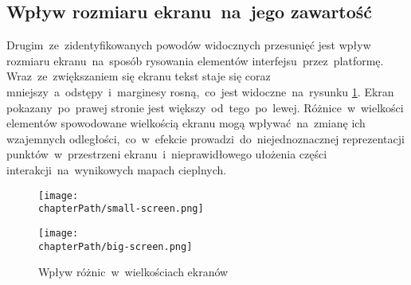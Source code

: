 \subsection{Wpływ rozmiaru ekranu~na~jego zawartość}
Drugim~ze~zidentyfikowanych powodów widocznych przesunięć jest wpływ rozmiaru ekranu~na~sposób rysowania elementów interfejsu~przez~platformę. Wraz~ze~zwiększaniem się ekranu tekst staje się coraz mniejszy~a~odstępy~i~marginesy rosną,~co~jest widoczne~na~rysunku \ref{fig:screen_sizes}. Ekran pokazany~po~prawej stronie jest większy~od~tego~po~lewej. Różnice~w~wielkości elementów spowodowane wielkością ekranu mogą wpływać~na~zmianę ich wzajemnych odległości,~co~w~efekcie prowadzi~do~niejednoznacznej reprezentacji punktów~w~przestrzeni ekranu~i~nieprawidłowego ułożenia części interakcji~na~wynikowych mapach cieplnych.

\bigskip
\begin{figure}[H]
\centering
\begin{minipage}{.36\textwidth}
	\centering
	\texttt{[image: \\chapterPath/small-screen.png]}
\end{minipage}
\begin{minipage}{.4\textwidth}
	\centering
	\texttt{[image: \\chapterPath/big-screen.png]}
\end{minipage}
\bigskip
\caption{Wpływ różnic~w~wielkościach ekranów}
\label{fig:screen_sizes}
\end{figure}
